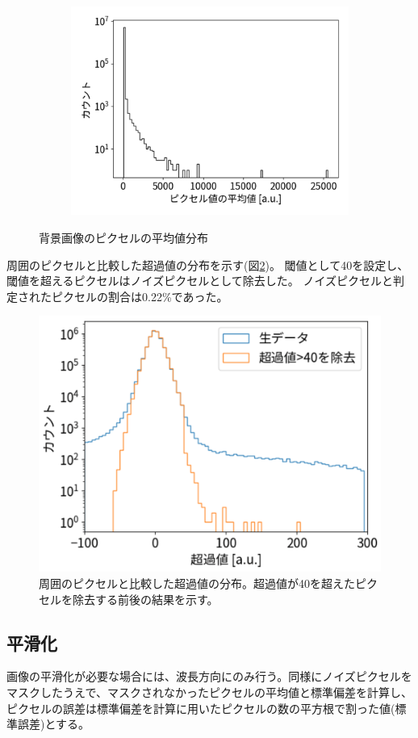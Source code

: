 \documentclass[a4paper,11pt,uplatex]{jsbook}
\begin{document}
\begin{figure}[h]
  \hfill
  \begin{subfigure}[b]{0.45\linewidth}
    \centering
    \includegraphics[width=\linewidth]{image/4-BGmeanall.png}
  \end{subfigure}
  \caption[背景画像の光量分布]{背景画像のピクセルの平均値分布}\label{BGmean}
\end{figure}

周囲のピクセルと比較した超過値の分布を示す(図\ref{excess})。
閾値として40を設定し、閾値を超えるピクセルはノイズピクセルとして除去した。
ノイズピクセルと判定されたピクセルの割合は0.22\%であった。
\begin{figure}[h]
  \centering
  \includegraphics[width=0.5\linewidth]{image/4-excess.png}
  \caption[超過値の分布]{周囲のピクセルと比較した超過値の分布。超過値が40を超えたピクセルを除去する前後の結果を示す。}\label{excess}
\end{figure}
\subsection{平滑化}
画像の平滑化が必要な場合には、波長方向にのみ行う。同様にノイズピクセルをマスクしたうえで、マスクされなかったピクセルの平均値と標準偏差を計算し、ピクセルの誤差は標準偏差を計算に用いたピクセルの数の平方根で割った値(標準誤差)とする。
\end{document}
